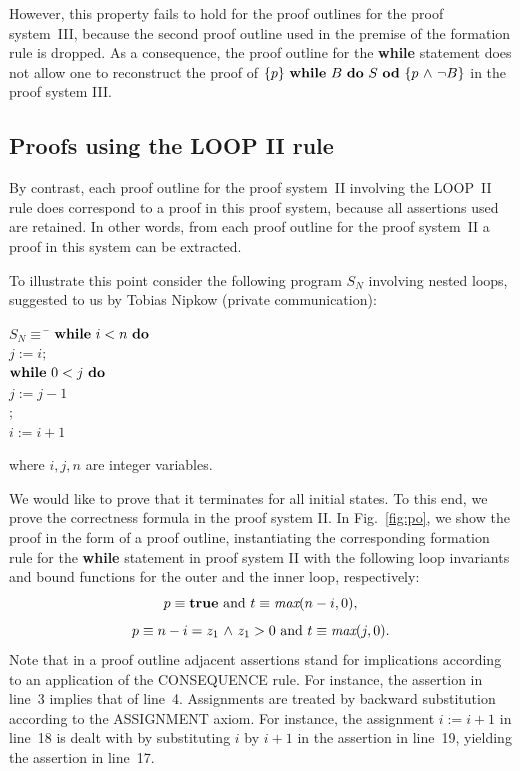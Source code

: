 \documentclass[runningheads]{llncs}       %
\begin{document}
However, this property fails to hold for the proof outlines for the proof
system~III, because the second proof outline used in the premise of the
formation rule is dropped. As a consequence, the proof outline for the
\textbf{while} statement does not allow one to reconstruct the proof
of $\mbox{$\{{p}\}\ {\mbox{$\mbox{{\bf while}\ } {B}\ \mbox{{\bf do}\ } {S}\ \mbox{{\bf od}}$}}\ \{{p \mbox{$\ \wedge\ $} \neg B}\}$}$ in the proof system III.


\subsection{Proofs using the LOOP II rule}

By contrast, each proof outline for the proof system~II involving the LOOP~II rule
does correspond to a proof in this proof system, because all assertions
used are retained. In other words, from each proof outline for the
proof system~II a proof in this system can be extracted.  

To illustrate this point consider the following program $S_N$ involving nested
loops, suggested to us by Tobias Nipkow (private communication):

\begin{tabbing}
\qquad\qquad
$S_N \equiv$ \= $\mbox{$\mbox{{\bf while}\ } {i < n}\ \mbox{{\bf do}\ }$}$           \\
\> \qquad $j:=i; $                     \\
\> \qquad $\mbox{$\mbox{{\bf while}\ } {0 < j}\ \mbox{{\bf do}\ }$}$                 \\
\> \qquad \qquad $j:=j-1$              \\
\> \qquad \OD ;                        \\
\> \qquad $i:=i+1$                     \\
\> \OD                                               
\end{tabbing}
\noindent
where $i, j, n$ are integer variables. 

\III

We would like to prove that it terminates
for all initial states. To this end, we prove the correctness formula
 in the proof system II.
In Fig.~\ref{fig:po}, we show the proof in the form of a proof outline,
instantiating the corresponding formation rule for the \textbf{while} statement in proof system II
with the following loop invariants and bound functions for the outer and the inner loop, respectively:                                                  \\
\[
  \mbox{$p \equiv \mbox{{\bf true}}$ and $t \equiv  \mbox{\it max}(n-i,0)$,}
\]
\[
  \mbox{$p \equiv  n-i = z_1 \mbox{$\ \wedge\ $} z_1>0$ and $t \equiv \mbox{\it max}(j,0)$.}
\]
Note that in a proof outline adjacent assertions stand for implications
according to an application of the CONSEQUENCE rule.
For instance, the assertion in line~3 implies that of line~4.
Assignments are treated by backward substitution according to the ASSIGNMENT axiom.
For instance, the assignment $i:=i+1$ in line~18 is dealt with by 
substituting $i$ by $i+1$ in the assertion in line~19, yielding
the assertion in line~17.
\end{document}
